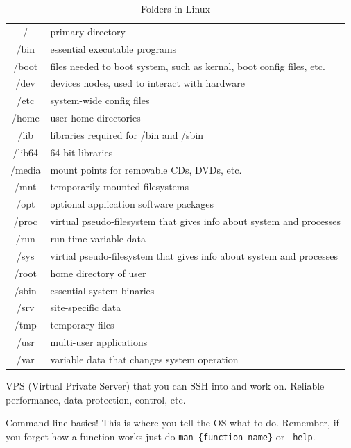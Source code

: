 \documentclass[11pt]{article}
\begin{document}
\begin{table}[ht]
    \centering
    \caption*{Folders in Linux}
    \begin{tabular}{|c|l|}
        \hline
        / & primary directory \\
        /bin & essential executable programs \\
        /boot & files needed to boot system, such as kernal, boot config files, etc. \\
        /dev &  devices nodes, used to interact with hardware\\
        /etc & system-wide config files \\
        /home & user home directories \\
        /lib &  libraries required for /bin and /sbin \\
        /lib64 & 64-bit libraries \\
        /media & mount points for removable CDs, DVDs, etc. \\
        /mnt & temporarily mounted filesystems \\
        /opt & optional application software packages \\
        /proc & virtual pseudo-filesystem that gives info about system and processes \\
        /run & run-time variable data \\
        /sys & virtial pseudo-filesystem that gives info about system and processes \\
        /root & home directory of user \\
        /sbin & essential system binaries \\
        /srv & site-specific data \\
        /tmp & temporary files \\
        /usr & multi-user applications \\
        /var & variable data that changes system operation \\
        \hline
    \end{tabular}
\end{table}

\newpage

\noindent VPS (Virtual Private Server) that you can SSH into and work on. Reliable performance, data protection, control, etc.

\noindent Command line basics! This is where you tell the OS what to do. Remember, if you forget how a function works just do \texttt{man \{function name\}} or \texttt{--help}. \\
\end{document}
